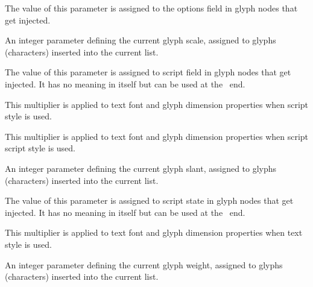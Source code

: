 The value of this parameter is assigned to the options field in glyph nodes that
get injected.

\starttworows
{}
\stoptworows

\stopnewprimitive

\startnewprimitive[title={\prm {glyphscale}}]

An integer parameter defining the current glyph scale, assigned to glyphs
(characters) inserted into the current list.

\stopnewprimitive

\startnewprimitive[title={\prm {glyphscriptfield}}]

The value of this parameter is assigned to script field in glyph nodes that get
injected. It has no meaning in itself but can be used at the \LUA\ end.

\stopnewprimitive

\startnewprimitive[title={\prm {glyphscriptscale}}]

This multiplier is applied to text font and glyph dimension properties when script
style is used.

\stopnewprimitive

\startnewprimitive[title={\prm {glyphscriptscriptscale}}]

This multiplier is applied to text font and glyph dimension properties when
script script style is used.

\stopnewprimitive

\startnewprimitive[title={\prm {glyphslant}}]

An integer parameter defining the current glyph slant, assigned to glyphs
(characters) inserted into the current list.

\stopnewprimitive

\startnewprimitive[title={\prm {glyphstatefield}}]

The value of this parameter is assigned to script state in glyph nodes that get
injected. It has no meaning in itself but can be used at the \LUA\ end.

\stopnewprimitive

\startnewprimitive[title={\prm {glyphtextscale}}]

This multiplier is applied to text font and glyph dimension properties when text
style is used.

\stopnewprimitive

\startnewprimitive[title={\prm {glyphweight}}]

An integer parameter defining the current glyph weight, assigned to glyphs
(characters) inserted into the current list.

